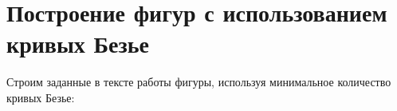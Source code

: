 \newpage
\section[Построение фигур с использованием кривых Безье]{Построение фигур с использованием кривых Безье}

Строим заданные в тексте работы фигуры, используя минимальное количество кривых Безье:
\begin{figure}[H]
    \begin{minipage}[h]{0.47\linewidth}
        \\
    \end{minipage}
    \hfill
    \begin{minipage}[h]{0.47\linewidth}
        \\
    \end{minipage}
    \vfill
    \begin{minipage}[h]{0.47\linewidth}
    \end{minipage}
    \hfill
    \begin{minipage}[h]{0.47\linewidth}
    \end{minipage}
\end{figure}
